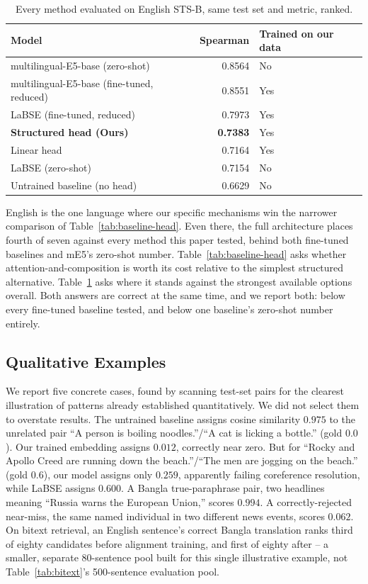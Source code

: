 \documentclass[manuscript]{acmart}
\begin{document}
\begin{table}[h]
\caption{Every method evaluated on English STS-B, same test set and metric, ranked.}
\label{tab:all-english}
\begin{tabular}{@{}lrl@{}}
\toprule
Model & Spearman & Trained on our data \\
\midrule
multilingual-E5-base (zero-shot) & 0.8564 & No \\
multilingual-E5-base (fine-tuned, reduced) & 0.8551 & Yes \\
LaBSE (fine-tuned, reduced) & 0.7973 & Yes \\
\textbf{Structured head (Ours)} & \textbf{0.7383} & Yes \\
Linear head & 0.7164 & Yes \\
LaBSE (zero-shot) & 0.7154 & No \\
Untrained baseline (no head) & 0.6629 & No \\
\bottomrule
\end{tabular}
\end{table}

English is the one language where our specific mechanisms win the narrower comparison of Table~\ref{tab:baseline-head}. Even there, the full architecture places fourth of seven against every method this paper tested, behind both fine-tuned baselines and mE5's zero-shot number. Table~\ref{tab:baseline-head} asks whether attention-and-composition is worth its cost relative to the simplest structured alternative. Table~\ref{tab:all-english} asks where it stands against the strongest available options overall. Both answers are correct at the same time, and we report both: below every fine-tuned baseline tested, and below one baseline's zero-shot number entirely.

\subsection{Qualitative Examples}

We report five concrete cases, found by scanning test-set pairs for the clearest illustration of patterns already established quantitatively. We did not select them to overstate results. The untrained baseline assigns cosine similarity $0.975$ to the unrelated pair ``A person is boiling noodles.''/``A cat is licking a bottle.'' (gold $0.0$). Our trained embedding assigns $0.012$, correctly near zero. But for ``Rocky and Apollo Creed are running down the beach.''/``The men are jogging on the beach.'' (gold $0.6$), our model assigns only $0.259$, apparently failing coreference resolution, while LaBSE assigns $0.600$. A Bangla true-paraphrase pair, two headlines meaning ``Russia warns the European Union,'' scores $0.994$. A correctly-rejected near-miss, the same named individual in two different news events, scores $0.062$. On bitext retrieval, an English sentence's correct Bangla translation ranks third of eighty candidates before alignment training, and first of eighty after -- a smaller, separate 80-sentence pool built for this single illustrative example, not Table~\ref{tab:bitext}'s 500-sentence evaluation pool.
\end{document}
